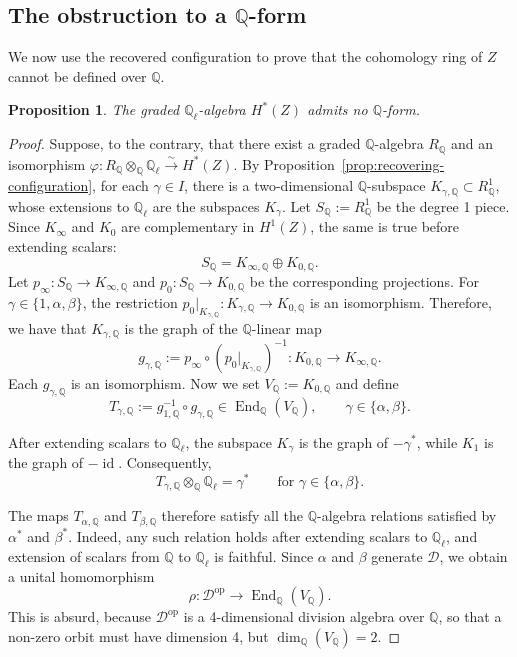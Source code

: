 \documentclass[11pt, reqno]{amsart}
\newtheorem{proposition}[theorem]{Proposition}
\theoremstyle{definition}
\newcommand\QQ{\mathbb{Q}}
\DeclareMathOperator{\End}{End}
\begin{document}
\subsection{The obstruction to a $\QQ$-form}
\label{subsubsec:obstruction-to-Q-form}\;

We now use the recovered configuration to prove that the cohomology ring
of $Z$ cannot be defined over $\QQ$.

\begin{proposition}
\label{prop:Z-has-no-Q-form}
The graded $\QQ_\ell$-algebra $H^*(Z)$ admits no $\QQ$-form.
\end{proposition}

\begin{proof}
Suppose, to the contrary, that there exist a graded $\QQ$-algebra
$R_{\QQ}$ and an isomorphism
$\varphi:
R_{\QQ}\otimes_{\QQ}\QQ_\ell
\xrightarrow{\sim}
H^*(Z)$.
By Proposition~\ref{prop:recovering-configuration}, for each $\gamma\in I$, there is a
two-dimensional $\QQ$-subspace $K_{\gamma,\QQ}\subset R_{\QQ}^1$,
whose extensions to $\QQ_\ell$ are the subspaces $K_\gamma$.
Let $S_{\QQ}:=R_{\QQ}^1$ be the degree 1 piece.
Since $K_\infty$ and $K_0$ are complementary in $H^1(Z)$, the same is
true before extending scalars:
\[
S_{\QQ}
=
K_{\infty,\QQ}\oplus K_{0,\QQ}.
\]
Let $p_\infty:S_{\QQ}\to K_{\infty,\QQ}$ and 
$p_0:S_{\QQ}\to K_{0,\QQ}$
be the corresponding projections.
For $\gamma\in\{1,\alpha,\beta\}$, the restriction $p_0|_{K_{\gamma,\QQ}}:
K_{\gamma,\QQ}\to K_{0,\QQ}$
is an isomorphism.  Therefore, we have that $K_{\gamma,\QQ}$ is the graph of the
$\QQ$-linear map
\[
g_{\gamma,\QQ}
:=
p_\infty\circ
\left(p_0|_{K_{\gamma,\QQ}}\right)^{-1}
:
K_{0,\QQ}\longrightarrow K_{\infty,\QQ}.
\]
Each $g_{\gamma,\QQ}$ is an isomorphism.  
Now we set $V_{\QQ}:=K_{0,\QQ}$
and define
\[
T_{\gamma,\QQ}
:=
g_{1,\QQ}^{-1}\circ g_{\gamma,\QQ}
\in\End_{\QQ}(V_{\QQ}),
\qquad
\gamma\in\{\alpha,\beta\}.
\]

After extending scalars to $\QQ_\ell$, the subspace $K_\gamma$ is the
graph of $-\gamma^*$, while $K_1$ is the graph of $-\operatorname{id}$.
Consequently,
\[
T_{\gamma,\QQ}\otimes_{\QQ}\QQ_\ell
=
\gamma^*
\qquad
\text{for }\gamma\in\{\alpha,\beta\}.
\]

The maps $T_{\alpha,\QQ}$ and $T_{\beta,\QQ}$ therefore satisfy all the
$\QQ$-algebra relations satisfied by $\alpha^*$ and $\beta^*$.  Indeed,
any such relation holds after extending scalars to $\QQ_\ell$, and
extension of scalars from $\QQ$ to $\QQ_\ell$ is faithful.  Since
$\alpha$ and $\beta$ generate $\mathcal D$, we obtain a unital
homomorphism
\[
\rho:
\mathcal D^{\mathrm{op}}
\longrightarrow
\End_{\QQ}(V_{\QQ}).
\]
This is absurd, because $\mathcal D^{\mathrm{op}}$ is a 4-dimensional division algebra over $\QQ$, so that a non-zero orbit must have dimension 4, but $\dim_{\QQ}(V_{\QQ})=2$.
\end{proof}
\end{document}
